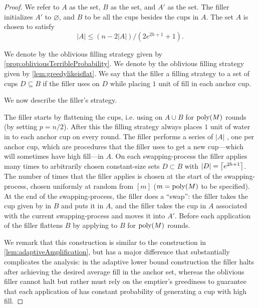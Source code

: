 \begin{proof}
  We refer to $A$ as the  set, $B$ as the
   set, and $A'$ as the  set.
  The filler initializes $A'$ to $\varnothing$, and $B$ to be all
  the cups besides the cups in $A$.
  The set $A$ is chosen to satisfy 
  \begin{equation}
    \label{eq:chooseBmuchbiggerthanA}
    |A| \le (n - 2|A|) / (2e^{2h+1} + 1).
  \end{equation}

We denote by \randalg the oblivious filling
strategy given by \cref{prop:obliviousTerribleProbability}. 
We denote by \flatalg the oblivious filling
strategy given by \cref{lem:greedylikeisflat}.
We say that the filler  a filling strategy
\genericalg to a set of cups $D \subseteq B$ if the filler uses
\genericalg on $D$ while placing $1$ unit of fill in each anchor cup. 

We now describe the filler's strategy.

The filler starts by flattening the cups, i.e. using \flatalg on
$A\cup B$ for $\operatorname{\text{poly}}(M)$ rounds (by setting $p=n/2$). After this the
filling strategy always places $1$ unit of water in to each
anchor cup on every round. The filler performs a series of $|A|$
, one per anchor cup, which are
procedures that the filler uses to get a new cup---which will
sometimes have high fill---in $A$. On each swapping-process the
filler applies \randalg many times to arbitrarily chosen
constant-size sets $D \subset B$ with $|D| = \left\lceil e^{2h+1} \right\rceil$.
The number of times that the filler applies \randalg is chosen at
the start of the swapping-process, chosen uniformly at random
from $[m]$ ($m = \operatorname{\text{poly}}(M)$ to be specified). At the end of the
swapping-process, the filler does a ``swap'': the filler takes the
cup given by \randalg in $B$ and puts it in $A$, and the filler
takes the cup in $A$ associated with the current swapping-process
and moves it into $A'$. Before each application of \randalg the
filler flattens $B$ by applying \flatalg to $B$ for $\operatorname{\text{poly}}(M)$
rounds. 

We remark that this construction is similar to the construction
in \cref{lem:adaptiveAmplification}, but has a major difference
that substantially complicates the analysis: in the adaptive
lower bound construction the filler halts after achieving the
desired average fill in the anchor set, whereas the oblivious
filler cannot halt but rather must rely on the emptier's
greediness to guarantee that each application of \randalg has
constant probability of generating a cup with high fill.


\end{proof}
